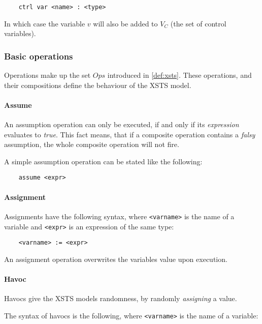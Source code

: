 \begin{Verbatim}
	ctrl var <name> : <type>
\end{Verbatim}

In which case the variable \(v\) will also be added to \(V_C\) (the set of control variables).

\subsubsection{Basic operations}

Operations make up the set \(Ops\) introduced in \autoref{def:xsts}. These operations, and their compositions define the behaviour of the XSTS model.

\paragraph{Assume}

An assumption operation can only be executed, if and only if its \emph{expression} evaluates to \emph{true}. This fact means, that if a composite operation contains a \emph{falsy} assumption, the whole composite operation will not fire.

A simple assumption operation can be stated like the following:

\begin{Verbatim}
	assume <expr>
\end{Verbatim}

\paragraph{Assignment}

Assignments have the following syntax, where \verb|<varname>| is the name of a variable and
\verb|<expr>| is an expression of the same type:

\begin{Verbatim}
	<varname> := <expr>
\end{Verbatim}

An assignment operation overwrites the variables value upon execution.

\paragraph{Havoc}

Havocs give the XSTS models randomness, by randomly \emph{assigning} a value.

The syntax of havocs is the following, where \verb|<varname>| is the name of a variable:

